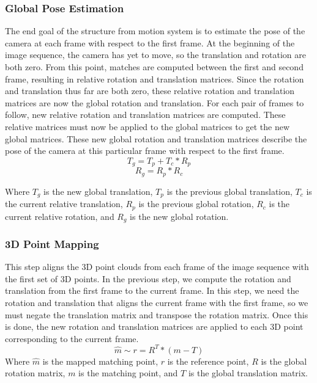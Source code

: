 \subsubsection{Global Pose Estimation}
	The end goal of the structure from motion system is to estimate the pose of the camera at each frame with respect to the first frame. At the beginning of the image sequence, the camera has yet to move, so the translation and rotation are both zero. From this point, matches are computed between the first and second frame, resulting in relative rotation and translation matrices. Since the rotation and translation thus far are both zero, these relative rotation and translation matrices are now the global rotation and translation. For each pair of frames to follow, new relative rotation and translation matrices are computed. These relative matrices must now be applied to the global matrices to get the new global matrices. These new global rotation and translation matrices describe the pose of the camera at this particular frame with respect to the first frame.
$$T_g = T_p + T_c * R_p$$
$$R_g = R_p * R_c$$

Where $T_{g}$ is the new global translation, $T_{p}$ is the previous global translation, $T_{c}$ is the current relative translation, $R_{p}$ is the previous global rotation, $R_{c}$ is the current relative rotation, and $R_{g}$ is the new global rotation.

\subsubsection{3D Point Mapping}
	This step aligns the 3D point clouds from each frame of the image sequence with the first set of 3D points. In the previous step, we compute the rotation and translation from the first frame to the current frame. In this step, we need the rotation and translation that aligns the current frame with the first frame, so we must negate the translation matrix and transpose the rotation matrix. Once this is done, the new rotation and translation matrices are applied to each 3D point corresponding to the current frame.
\begin{displaymath}
\hat{m} \sim r = R^T * (m-T)
\end{displaymath}
Where $\hat{m}$ is the mapped matching point, $r$ is the reference point, $R$ is the global rotation matrix, $m$ is the matching point, and $T$ is the global translation matrix.



